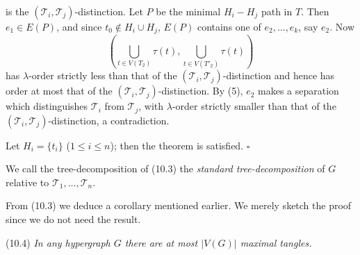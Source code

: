 \noindent is the $(\mathscr{T}_i, \mathscr{T}_j)$-distinction. Let $P$ be the minimal $H_i - H_j$ path in $T$. Then $e_1 \in E(P)$, and since $t_0 \notin H_i \cup H_j$, $E(P)$ contains one of $e_2, \dots, e_k$, say $e_2$. Now
\begin{equation*}
\left( \bigcup_{t \in V(T_2)} \tau(t), \bigcup_{t \in V(T'_2)} \tau(t) \right)
\end{equation*}
has $\lambda$-order strictly less than that of the $(\mathscr{T}_i, \mathscr{T}_j)$-distinction and hence has order at most that of the $(\mathscr{T}_i, \mathscr{T}_j)$-distinction. By (5), $e_2$ makes a separation which distinguishes $\mathscr{T}_i$ from $\mathscr{T}_j$, with $\lambda$-order strictly smaller than that of the $(\mathscr{T}_i, \mathscr{T}_j)$-distinction, a contradiction.

Let $H_i = \{t_i\}$ ($1 \le i \le n$); then the theorem is satisfied. $\square$

We call the tree-decomposition of (10.3) the \textit{standard tree-decomposition} of $G$ relative to $\mathscr{T}_1, \dots, \mathscr{T}_n$.

From (10.3) we deduce a corollary mentioned earlier. We merely sketch the proof since we do not need the result.

\stmt
(10.4) \textit{In any hypergraph $G$ there are at most $|V(G)|$ maximal tangles.}


